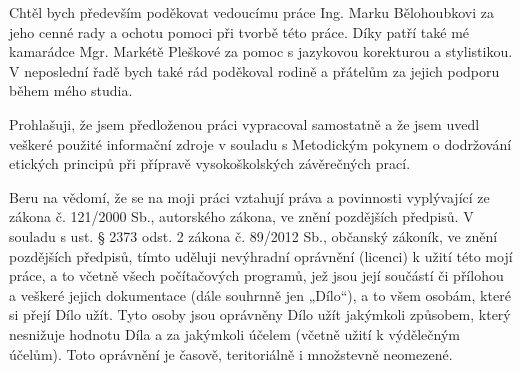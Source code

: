 \documentclass[czech,bachelor,twoside,bw]{ctufit-thesis}
\begin{document}
\frontmatter\frontmatterinit %

\thispagestyle{empty}\maketitle\thispagestyle{empty}\cleardoublepage %


\imprintpage %
\stopTOCentries

\begin{acknowledgmentpage}
	Chtěl bych především poděkovat vedoucímu práce Ing. Marku Bělohoubkovi za jeho cenné rady a ochotu pomoci při tvorbě této práce. Díky patří také mé kamarádce Mgr. Markétě Pleškové za pomoc s jazykovou korekturou a stylistikou. V neposlední řadě bych také rád poděkoval rodině a přátelům za jejich podporu během mého studia.
\end{acknowledgmentpage}


\begin{declarationpage}
Prohlašuji, že jsem předloženou práci vypracoval samostatně a že jsem uvedl veškeré
použité informační zdroje v souladu s Metodickým pokynem o dodržování etických
principů při přípravě vysokoškolských závěrečných prací.

Beru na vědomí, že se na moji práci vztahují práva a povinnosti vyplývající ze zákona
č. 121/2000 Sb., autorského zákona, ve znění pozdějších předpisů. V souladu s ust.
§ 2373 odst. 2 zákona č. 89/2012 Sb., občanský zákoník, ve znění pozdějších předpisů,
tímto uděluji nevýhradní oprávnění (licenci) k užití této mojí práce, a to včetně všech
počítačových programů, jež jsou její součástí či přílohou a veškeré jejich
dokumentace (dále souhrnně jen „Dílo“), a to všem osobám, které si přejí Dílo užít.
Tyto osoby jsou oprávněny Dílo užít jakýmkoli způsobem, který nesnižuje hodnotu
Díla a za jakýmkoli účelem (včetně užití k výdělečným účelům). Toto oprávnění je
časově, teritoriálně i množstevně neomezené.
\end{declarationpage}
\end{document}
